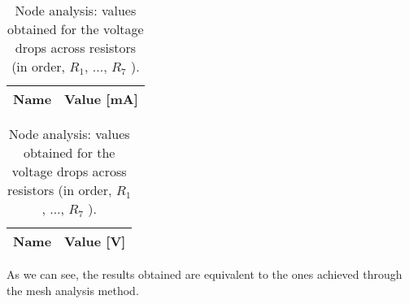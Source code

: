 \begin{table}[h]
  \parbox{.45\linewidth}{
    \centering
    \begin{tabular}{|c|c|}
      \hline
      {\bf Name} & {\bf Value [mA]} \\ \hline
      
    \end{tabular}
    \caption{Node analysis: values obtained for the currents running through the resistors.}
  }
  \hfill
  \parbox{.45\linewidth}{
    \centering
    \begin{tabular}{|c|c|}
      \hline
      {\bf Name} & {\bf Value [V]} \\ \hline
      
    \end{tabular}
    \caption{Node analysis: values obtained for the voltage drops across resistors (in order, $R_{1}$, ..., $R_{7}$ ).}
  }
\end{table}
As we can see, the results obtained are equivalent to the ones achieved through the mesh analysis method.